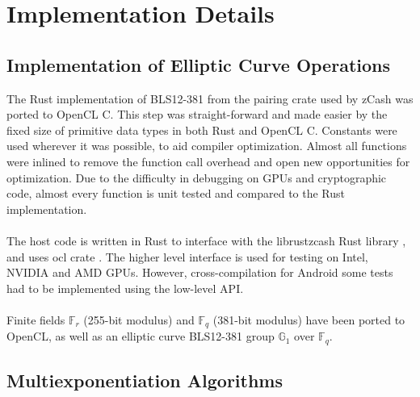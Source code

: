 \chapter{Implementation Details} %

\label{Chapter5} %


\section{Implementation of Elliptic Curve Operations}


The Rust implementation of BLS12-381 from the pairing crate \cite{githubpairing} used by zCash was ported to OpenCL C. This step was straight-forward and made easier by the fixed size of primitive data types in both Rust and OpenCL C. Constants were used wherever it was possible, to aid compiler optimization. Almost all functions were inlined to remove the function call overhead and open new opportunities for optimization. Due to the difficulty in debugging on GPUs and cryptographic code, almost every function is unit tested and compared to the Rust implementation.\\
\\
The host code is written in Rust to interface with the librustzcash Rust library \cite{githublibrustzcash}, and uses ocl crate \cite{githubocl}. The higher level interface is used for testing on Intel, NVIDIA and AMD GPUs. However, cross-compilation for Android some tests had to be implemented using the low-level API.\\
\\
Finite fields $\mathbb{F}_r$ (255-bit modulus) and $\mathbb{F}_q$ (381-bit modulus) have been ported to OpenCL, as well as an elliptic curve BLS12-381 group $\mathbb{G}_1$ over $\mathbb{F}_q$.

\section{Multiexponentiation Algorithms}

